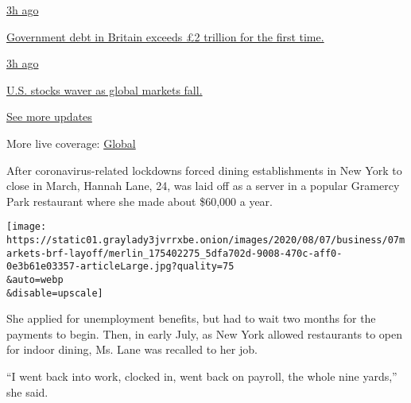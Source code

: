 \href{https://www.nytimes3xbfgragh.onion/live/2020/08/21/business/stock-market-today-coronavirus?action=click\&pgtype=Article\&state=default\&region=MAIN_CONTENT_1\&context=storylines_live_updates\#government-debt-in-britain-exceeds-2-trillion-for-the-first-time}{3h
ago}

\href{https://www.nytimes3xbfgragh.onion/live/2020/08/21/business/stock-market-today-coronavirus?action=click\&pgtype=Article\&state=default\&region=MAIN_CONTENT_1\&context=storylines_live_updates\#government-debt-in-britain-exceeds-2-trillion-for-the-first-time}{Government
debt in Britain exceeds £2 trillion for the first time.}

\href{https://www.nytimes3xbfgragh.onion/live/2020/08/21/business/stock-market-today-coronavirus?action=click\&pgtype=Article\&state=default\&region=MAIN_CONTENT_1\&context=storylines_live_updates\#us-stocks-waver-as-global-markets-fall}{3h
ago}

\href{https://www.nytimes3xbfgragh.onion/live/2020/08/21/business/stock-market-today-coronavirus?action=click\&pgtype=Article\&state=default\&region=MAIN_CONTENT_1\&context=storylines_live_updates\#us-stocks-waver-as-global-markets-fall}{U.S.
stocks waver as global markets fall.}

\href{https://www.nytimes3xbfgragh.onion/live/2020/08/21/business/stock-market-today-coronavirus?action=click\&pgtype=Article\&state=default\&region=MAIN_CONTENT_1\&context=storylines_live_updates}{See
more updates}

More live coverage:
\href{https://www.nytimes3xbfgragh.onion/2020/08/21/world/covid-19-coronavirus.html?action=click\&pgtype=Article\&state=default\&region=MAIN_CONTENT_1\&context=storylines_live_updates}{Global}

After coronavirus-related lockdowns forced dining establishments in New
York to close in March, Hannah Lane, 24, was laid off as a server in a
popular Gramercy Park restaurant where she made about \$60,000 a year.

\texttt{[image: https://static01.graylady3jvrrxbe.onion/images/2020/08/07/business/07markets-brf-layoff/merlin\_175402275\_5dfa702d-9008-470c-aff0-0e3b61e03357-articleLarge.jpg?quality=75\\\&auto=webp\\\&disable=upscale]}

She applied for unemployment benefits, but had to wait two months for
the payments to begin. Then, in early July, as New York allowed
restaurants to open for indoor dining, Ms. Lane was recalled to her job.

``I went back into work, clocked in, went back on payroll, the whole
nine yards,'' she said.

